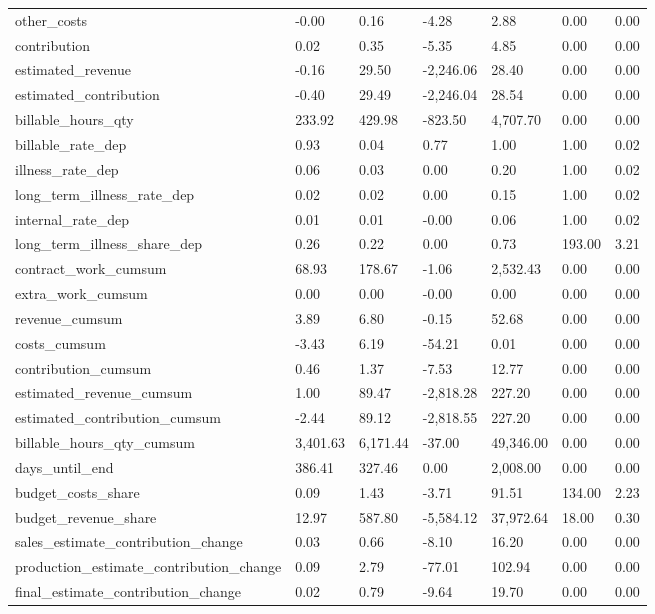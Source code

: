 \begin{landscape}
\begin{longtable}[h!]{lllllll}
other_costs & -0.00 & 0.16 & -4.28 & 2.88 & 0.00 & 0.00 \\
contribution & 0.02 & 0.35 & -5.35 & 4.85 & 0.00 & 0.00 \\
estimated_revenue & -0.16 & 29.50 & -2,246.06 & 28.40 & 0.00 & 0.00 \\
estimated_contribution & -0.40 & 29.49 & -2,246.04 & 28.54 & 0.00 & 0.00 \\
billable_hours_qty & 233.92 & 429.98 & -823.50 & 4,707.70 & 0.00 & 0.00 \\
billable_rate_dep & 0.93 & 0.04 & 0.77 & 1.00 & 1.00 & 0.02 \\
illness_rate_dep & 0.06 & 0.03 & 0.00 & 0.20 & 1.00 & 0.02 \\
long_term_illness_rate_dep & 0.02 & 0.02 & 0.00 & 0.15 & 1.00 & 0.02 \\
internal_rate_dep & 0.01 & 0.01 & -0.00 & 0.06 & 1.00 & 0.02 \\
long_term_illness_share_dep & 0.26 & 0.22 & 0.00 & 0.73 & 193.00 & 3.21 \\
contract_work_cumsum & 68.93 & 178.67 & -1.06 & 2,532.43 & 0.00 & 0.00 \\
extra_work_cumsum & 0.00 & 0.00 & -0.00 & 0.00 & 0.00 & 0.00 \\
revenue_cumsum & 3.89 & 6.80 & -0.15 & 52.68 & 0.00 & 0.00 \\
costs_cumsum & -3.43 & 6.19 & -54.21 & 0.01 & 0.00 & 0.00 \\
contribution_cumsum & 0.46 & 1.37 & -7.53 & 12.77 & 0.00 & 0.00 \\
estimated_revenue_cumsum & 1.00 & 89.47 & -2,818.28 & 227.20 & 0.00 & 0.00 \\
estimated_contribution_cumsum & -2.44 & 89.12 & -2,818.55 & 227.20 & 0.00 & 0.00 \\
billable_hours_qty_cumsum & 3,401.63 & 6,171.44 & -37.00 & 49,346.00 & 0.00 & 0.00 \\
days_until_end & 386.41 & 327.46 & 0.00 & 2,008.00 & 0.00 & 0.00 \\
budget_costs_share & 0.09 & 1.43 & -3.71 & 91.51 & 134.00 & 2.23 \\
budget_revenue_share & 12.97 & 587.80 & -5,584.12 & 37,972.64 & 18.00 & 0.30 \\
sales_estimate_contribution_change & 0.03 & 0.66 & -8.10 & 16.20 & 0.00 & 0.00 \\
production_estimate_contribution_change & 0.09 & 2.79 & -77.01 & 102.94 & 0.00 & 0.00 \\
final_estimate_contribution_change & 0.02 & 0.79 & -9.64 & 19.70 & 0.00 & 0.00 \\

\end{longtable}
\end{landscape}

